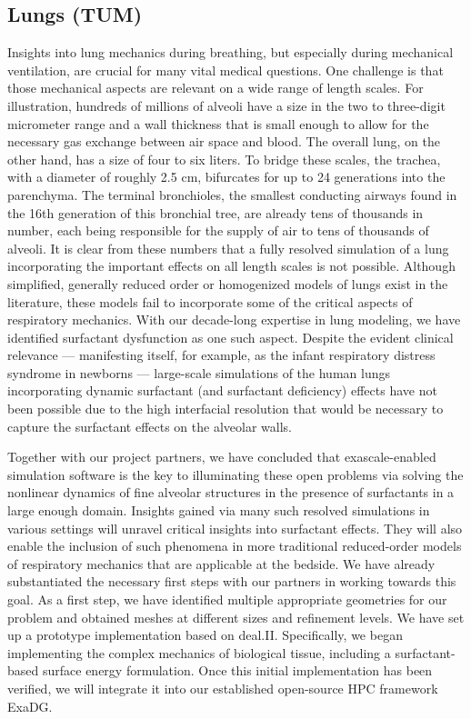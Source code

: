 \documentclass[a4paper,12pt]{article}
\begin{document}
\subsection{Lungs (TUM)}
Insights into lung mechanics during breathing, but especially during mechanical ventilation, are crucial for many vital medical questions.
One challenge is that those mechanical aspects are relevant on a wide range of length scales.
For illustration, hundreds of millions of alveoli have a size in the two to three-digit micrometer range and a wall thickness that is small enough to allow for the necessary gas exchange between air space and blood.
The overall lung, on the other hand, has a size of four to six liters.
To bridge these scales, the trachea, with a diameter of roughly 2.5 cm, bifurcates for up to 24 generations into the parenchyma.
The terminal bronchioles, the smallest conducting airways found in the 16th generation of this bronchial tree, are already tens of thousands in number, each being responsible for the supply of air to tens of thousands of alveoli.
It is clear from these numbers that a fully resolved simulation of a lung incorporating the important effects on all length scales is not possible.
Although simplified, generally reduced order or homogenized models of lungs exist in the literature, these models fail to incorporate some of the critical aspects of respiratory mechanics.
With our decade-long expertise in lung modeling, we have identified surfactant dysfunction as one such aspect.
Despite the evident clinical relevance — manifesting itself, for example, as the infant respiratory distress syndrome in newborns — large-scale simulations of the human lungs incorporating dynamic surfactant (and surfactant deficiency) effects have not been possible due to the high interfacial resolution that would be necessary to capture the surfactant effects on the alveolar walls.

Together with our project partners, we have concluded that exascale-enabled simulation software is the key to illuminating these open problems via solving the nonlinear dynamics of fine alveolar structures in the presence of surfactants in a large enough domain.
Insights gained via many such resolved simulations in various settings will unravel critical insights into surfactant effects.
They will also enable the inclusion of such phenomena in more traditional reduced-order models of respiratory mechanics that are applicable at the bedside.
We have already substantiated the necessary first steps with our partners in working towards this goal.
As a first step, we have identified multiple appropriate geometries for our problem and obtained meshes at different sizes and refinement levels.
We have set up a prototype implementation based on deal.II.
Specifically, we began implementing the complex mechanics of biological tissue, including a surfactant-based surface energy formulation.
Once this initial implementation has been verified, we will integrate it into our established open-source HPC framework ExaDG.
\end{document}
